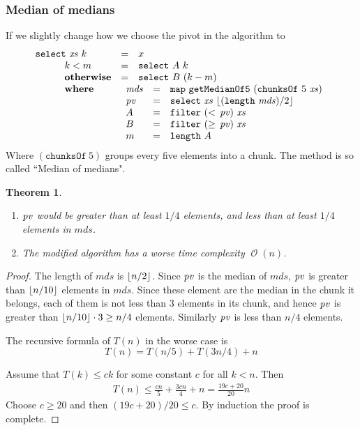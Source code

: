 \documentclass[12pt, a4paper]{article}
\DeclarePairedDelimiter{\floor}{\lfloor}{\rfloor}
\newcommand{\opord}{\operatorname{\mathcal{O}}}
\newcommand{\ord}[1]{\opord\left(#1\right)}
\newtheorem{theorem}{Theorem}
\begin{document}
\subsubsection{Median of medians} \label{mom}
If we slightly change how we choose the pivot in the algorithm to 
\[
  \begin{array}{lcl}
    \mathtt{select} \ \xs \ k & = & x \\
    \hspace*{30pt} k < m    & = & \mathtt{select} \ A \ k \\
    \hspace*{30pt} \text{\bf otherwise}    & = & \mathtt{select} \ B \ (k-m) \\
    \hspace*{30pt} \text{\bf where} & \multicolumn{2}{l}{
      \begin{array}[t]{lcl}
        \mathit{mds} & = & \mathtt{map} \ \mathtt{getMedianOf5} \ (\mathtt{chunksOf} \ 5 \ \xs) \\
        \pv & = & \mathtt{select} \ \xs \ \floor{(\texttt{length} \ \mathit{mds})/2}  \\
        A & = & \mathtt{filter} \ (< \,\pv) \ \xs \\
        B & = & \mathtt{filter} \ (\geq \,\pv) \ \xs \\
        m & = & \mathtt{length} \ A
      \end{array}
    }
  \end{array}
\]
Where $(\mathtt{chunksOf} \ 5)$ groups every five elements into a chunk. The method is so called ``Median 
of medians".


\begin{theorem} \hfill
  \begin{enumerate}
    \item $\mathit{pv}$ would be greater than at least $1/4$ elements, and less than at least $1/4$
      elements in $\mathit{mds}$.
    \item The modified algorithm has a worse time complexity $\ord{n}$.
  \end{enumerate}
\end{theorem}

\begin{proof}
  The length of $\mathit{mds}$ is $\floor{n/2}$.
  Since $\mathit{pv}$ is the median of $\mathit{mds}$, $\mathit{pv}$ is greater than $\floor{n/10}$ elements
  in $\mathit{mds}$. Since these element are the median in the chunk it belongs, each 
  of them is not less than $3$ elements in its chunk, and hence $\mathit{pv}$ is greater than 
  $\floor{n/10} \cdot 3 \geq n/4$ elements. Similarly $\mathit{pv}$ is less than $n/4$ elements.

  The recursive formula of $T(n)$ in the worse case is
  \[ T(n) = T(n/5) + T(3n/4) + n \]

  Assume that $T(k) \leq ck$ for some constant $c$ for all $k < n$. Then
  \begin{align*}
    T(n) \leq \frac{cn}{5} + \frac{3cn}{4} + n = \frac{19c + 20}{20} n
  \end{align*}
  Choose $c \geq 20$ and then $(19c+20)/20 \leq c$. By induction the proof is complete.

\end{proof}
\end{document}
